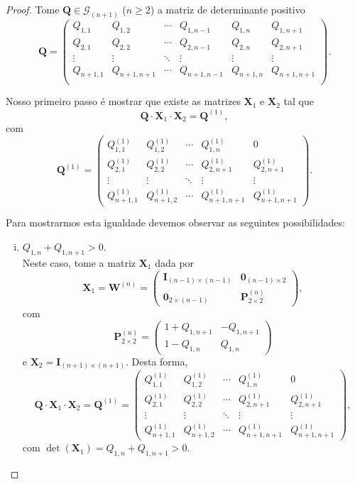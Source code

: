 \documentclass[twoside,openright,titlepage,numbers=noenddot,headinclude,  lineheaders footinclude=true,cleardoublepage=empty,
                                BCOR=5mm,paper=a4,fontsize=12pt ]{scrbook}
\theoremstyle{definition}
\begin{document}
\begin{proof}
Tome $\mathbf{Q}
\in \mathcal{G}_{(n+1)}$ ($n \geq 2$) a matriz de 
determinante positivo 
\[
\mathbf{Q} =
\begin{pmatrix}
Q_{1,1} & Q_{1,2} & \cdots & Q_{1,n-1} & Q_{1,n} & Q_{1,n+1}\\
Q_{2,1} & Q_{2,2} & \cdots & Q_{2,n-1} & Q_{2,n} & Q_{2,n+1}\\
\vdots  & \vdots  & \ddots & \vdots    & \vdots  & \vdots \\
Q_{n+1,1} & Q_{n+1,n+1} & \cdots & Q_{n+1,n-1} &
 Q_{n+1,n} & Q_{n+1,n+1}\\
\end{pmatrix}
.
\]

Nosso primeiro passo é mostrar que existe as matrizes 
$\mathbf{X}_1$ e $\mathbf{X}_2$ 
tal que
\[
\mathbf{Q} \cdot \mathbf{X}_1 \cdot
\mathbf{X}_2 =
\mathbf{Q}^{(1)},
\]
com 
\[
\mathbf{Q}^{(1)} = 
\begin{pmatrix}
Q^{(1)}_{1,1} & Q^{(1)}_{1,2} & \cdots & Q^{(1)}_{1,n} &0\\
Q^{(1)}_{2,1} & Q^{(1)}_{2,2} & \cdots & Q^{(1)}_{2,n+1}&
Q^{(1)}_{2,n+1}\\
\vdots & \vdots & \ddots & \vdots & \vdots \\
Q^{(1)}_{n+1,1} & Q^{(1)}_{n+1,2} & \cdots & Q^{(1)}_{n+1,n+1} &
Q^{(1)}_{n+1,n+1}
\end{pmatrix}
.
\]

Para mostrarmos esta igualdade devemos observar as seguintes
possibilidades:
\begin{enumerate}[(i)]
\item  $Q_{1,n} + Q_{1, n+1} > 0$. \hfill \\
Neste caso, tome a matriz $\mathbf{X}_1$ dada por
\[
\mathbf{X}_1 = 
\mathbf{W}^{(n)} = 
\begin{pmatrix}
\mathbf{I}_{(n-1)\times (n-1)}& \mathbf{0}_{(n-1) \times 2} \\
\mathbf{0}_{2 \times (n-1)}   & \mathbf{P}^{(n)}_{2 \times 2}   
\end{pmatrix}
,
\]
com 
\[
\mathbf{P}^{(n)}_{2 \times 2}
=
\begin{pmatrix}
1 + Q_{1, n+1} & -Q_{1, n+1} \\
1 - Q_{1,n}    & Q_{1,n}
\end{pmatrix}
\]
e $\bm{X}_2 = \bm{I}_{(n+1) \times (n+1)}$.
Desta forma,
\[
\bm{Q} \cdot \bm{X}_1 \cdot \bm{X}_2 =
\mathbf{Q}^{(1)} = 
\begin{pmatrix}
Q^{(1)}_{1,1} & Q^{(1)}_{1,2} & \cdots & Q^{(1)}_{1,n} &0\\
Q^{(1)}_{2,1} & Q^{(1)}_{2,2} & \cdots & Q^{(1)}_{2,n+1}&
Q^{(1)}_{2,n+1}\\
\vdots & \vdots & \ddots & \vdots & \vdots \\
Q^{(1)}_{n+1,1} & Q^{(1)}_{n+1,2} & \cdots & Q^{(1)}_{n+1,n+1} &
Q^{(1)}_{n+1,n+1}
\end{pmatrix}
,
\]
com $\det(\mathbf{X}_1) = Q_{1,n} + Q_{1, n+1} > 0$.


\end{enumerate}
\end{proof}
\end{document}
